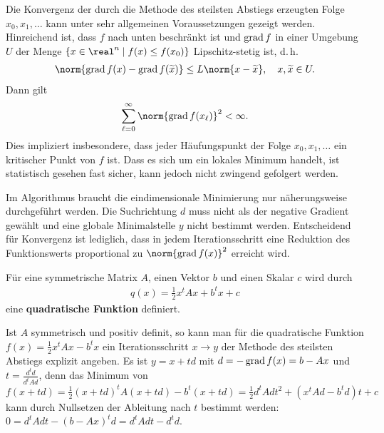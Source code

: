 \linie

Die Konvergenz der durch die Methode des steilsten Abstiegs erzeugten Folge
$x_0, x_1, \dotsc$ kann unter sehr allgemeinen Voraussetzungen gezeigt werden.
Hinreichend ist, dass $f$ nach unten beschränkt ist und $\operatorname{grad} f$ in einer
Umgebung $U$ der Menge $\{x \in \real^n \;|\; f(x) \le f(x_0)\}$
Lipschitz-stetig ist, d.\,h.
\begin{align*}
    \norm{\grad f(x) - \grad f(\widetilde{x})} \le L \norm{x - \widetilde{x}},
    \quad x, \widetilde{x} \in U.
\end{align*}
Dann gilt
\begin{align*}
    \sum_{\ell=0}^\infty \norm{\grad f(x_\ell)}^2 < \infty.
\end{align*}
Dies impliziert insbesondere, dass jeder Häufungspunkt der Folge
$x_0, x_1, \dotsc$ ein kritischer Punkt von $f$ ist.
Dass es sich um ein lokales Minimum handelt, ist statistisch gesehen fast
sicher, kann jedoch nicht zwingend gefolgert werden.

\linie

Im Algorithmus braucht die eindimensionale Minimierung nur näherungsweise
durchgeführt werden.
Die Suchrichtung $d$ muss nicht als der negative Gradient gewählt und
eine globale Minimalstelle $y$ nicht bestimmt werden.
Entscheidend für Konvergenz ist lediglich, dass in jedem Iterationsschritt
eine Reduktion des Funktionswerts proportional zu $\norm{\grad f(x)}^2$
erreicht wird.

\linie

Für eine symmetrische Matrix $A$, einen Vektor $b$ und einen Skalar $c$
wird durch
\begin{align*}
    q(x) = \frac{1}{2} x^t A x + b^t x + c
\end{align*}
eine \textbf{quadratische Funktion} definiert.

Ist $A$ symmetrisch und positiv definit, so kann man für die quadratische
Funktion \\
$f(x) = \frac{1}{2} x^t A x - b^t x$ ein Iterationsschritt $x \rightarrow y$
der Methode des steilsten Abstiegs explizit angeben.
Es ist $y = x + td$ mit $d = -\operatorname{grad} f(x) = b - Ax$ und
$t = \frac{d^t d}{d^t A d}$, denn das Minimum von
$f(x + td) = \frac{1}{2} (x + td)^t A (x + td) - b^t (x + td)
= \frac{1}{2} d^t A d t^2 + (x^t A d - b^t d) t + c$
kann durch Nullsetzen der Ableitung nach $t$ bestimmt werden:
$0 = d^t A d t - (b - Ax)^t d = d^t A d t - d^t d$.

